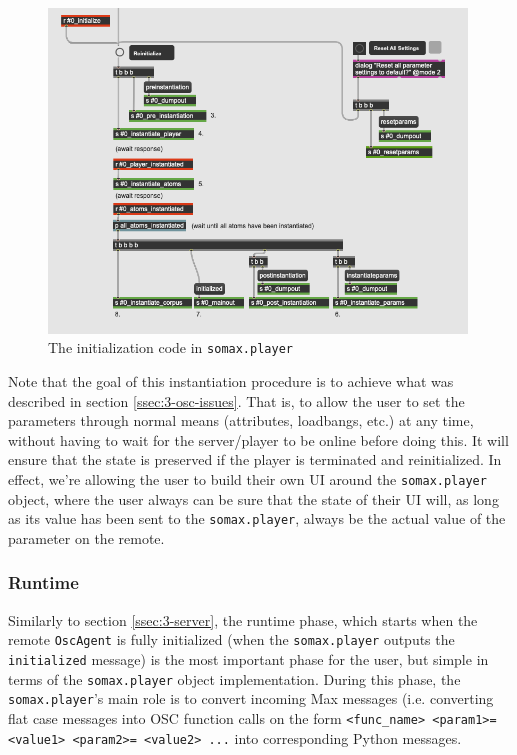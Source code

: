  \begin{figure}[h!]
    \centering        
 	\includegraphics[width=0.99\textwidth, keepaspectratio]{figures/player_initialization.png}
    \caption{The initialization code in \texttt{somax.player}}
    \label{fig:3-player-initialization}
\end{figure}

\noindent Note that the goal of this instantiation procedure is to achieve what was described in section \ref{ssec:3-osc-issues}. That is, to allow the user to set the parameters through normal means (attributes, loadbangs, etc.) at any time, without having to wait for the server/player to be online before doing this. It will ensure that the state is preserved if the player is terminated and reinitialized. In effect, we're allowing the user to build their own UI around the \texttt{somax.player} object, where the user always can be sure that the state of their UI will, as long as its value has been sent to the \texttt{somax.player}, always be the actual value of the parameter on the remote.


\subsubsection{Runtime}
Similarly to section \ref{ssec:3-server}, the runtime phase, which starts when the remote \texttt{OscAgent} is fully initialized (when the \texttt{somax.player} outputs the \texttt{initialized} message) is the most important phase for the user, but simple in terms of the \texttt{somax.player} object implementation. During this phase, the \texttt{somax.player}'s main role is to convert incoming Max messages (i.e. converting flat case messages into OSC function calls on the form \texttt{<func\_name> <param1>= <value1> <param2>= <value2> ...} into corresponding Python messages. 

